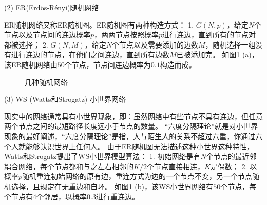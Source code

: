 (2) ER(Erd\"{o}s-R{\'e}nyi)随机网络 \cite{Erdoes1959}

ER随机网络又称ER随机图。ER随机图有两种构造方式：
1. $ G(N,p) $，给定$ N $个节点以及节点间的连边概率$ p $，两两节点按照概率$ p $进行连边，直到所有的节点对都被选择；
2. $ G(N,M) $，给定$ N $个节点以及需要添加的边数$ M $，随机选择一组没有进行连边的节点，在他们之间连边，直到所有边数$ M $已被添加完。
如图\ref{Fig: random} (a)，该ER随机网络由$ 50 $个节点，节点间连边概率为$ 0.1 $构造而成。

\begin{figure}[t]
	\centering
	\hfil
	\hfil
	
	\caption{几种随机网络}
	\label{Fig: random}
\end{figure}

(3) WS (Watts和Strogatz) 小世界网络 \cite{Watts1998}

现实中的网络通常具有小世界现象，即：虽然网络中有些节点不具有连边，但任意两个节点之间的最短路径长度远小于节点的数量。
“六度分隔理论”就是对小世界现象的最好阐述，“六度分隔理论”是指，人与陌生人的关系不超过六重，你通过六个人就能够认识世界上任何人。
由于ER随机图无法描述这种小世界这种特性，Watts和Strogatz提出了WS小世界模型算法：
1. 初始网络是有$ N $个节点的最近邻耦合网络，每个节点都和与之左右相邻的$ K/2 $个节点直接相连，$ K $是偶数；
2. 以概率$ p $随机重连初始网络的原有边，重连方式为边的一个节点不变，另一个节点随机选择，且规定在无重边和自环。
如图\ref{Fig: random} (b)，该WS小世界网络有$ 50 $个节点，每个节点有$ 4 $个邻居，以概率$ 0.3 $进行重连边。


